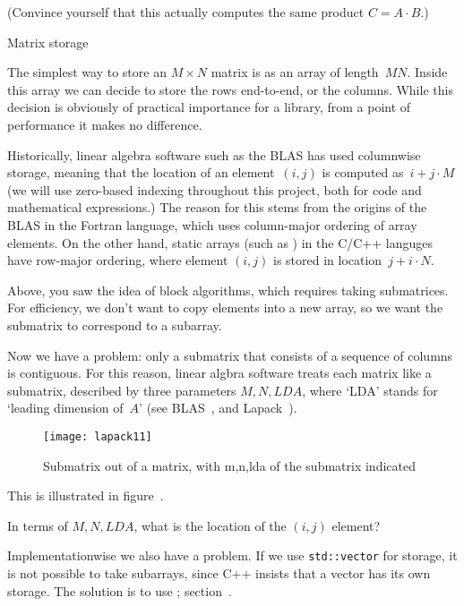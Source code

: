 (Convince yourself that this actually computes the same product
$C=A\cdot B$.)

 {Matrix storage}

The simplest way to store an $M\times N$ matrix is as an array of
length~$MN$.
Inside this array we can decide to store the rows
end-to-end, or the columns.
While this decision is obviously of practical importance
for a library, from a point of performance it makes no difference.

\begin{remark}
  Historically, linear algebra software
  such as the \ac{BLAS}
  has used columnwise storage,
  meaning that the location of an element~$(i,j)$ is computed as~$i+j\cdot M$
  (we will use zero-based indexing throughout this project, both for code
  and mathematical expressions.)
  The reason for this stems from the origins of the \ac{BLAS}
  in the Fortran language, which uses column-major ordering of array elements.
  On the other hand, static arrays (such as )
  in the C/C++ languges have row-major ordering,
  where element $(i,j)$ is stored in location~$j+i\cdot N$.
\end{remark}

Above, you saw the idea of block algorithms, which requires taking
submatrices. For efficiency, we don't want to copy elements into a new
array, so we want the submatrix to correspond to a subarray.

Now we have a problem: only a submatrix that consists of a sequence of
columns is contiguous. For this reason, linear algbra software treats
each matrix like a submatrix, described by three parameters
$M,N,\mathord{LDA}$, where `LDA' stands for `leading dimension
of~$A$' (see \ac{BLAS}~\cite{Lawson:blas}, and Lapack~\cite{WN20}).
%
\begin{figure}[ht]
  \texttt{[image: lapack11]}
  \caption{Submatrix out of a matrix, with m,n,lda of the submatrix
    indicated}
  \label{fig:lapack11}
\end{figure}
%
This is illustrated in figure~.

\begin{exercise}
  In terms of $M,N,\mathord{LDA}$, what is the location of the $(i,j)$
  element?
\end{exercise}

Implementationwise we also have a problem. If we use
\lstinline{std::vector} for storage, it is not possible to take
subarrays, since C++ insists that a vector has its own storage. The
solution is to use ; section~.

